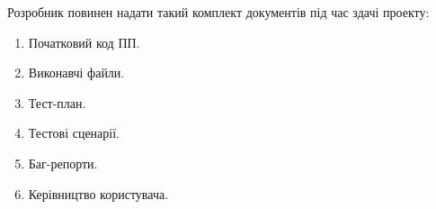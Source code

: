 \documentclass[a4paper,oneside,DIV=12,12pt]{scrartcl}
\begin{document}
		Розробник повинен надати такий комплект документів під час здачі проекту:
		\begin{enumerate}
			\item Початковий код ПП.
			\item Виконавчі файли.
			\item Тест-план.
			\item Тестові сценарії.
			\item Баг-репорти.
			\item Керівництво користувача.
		\end{enumerate}

\end{document}
